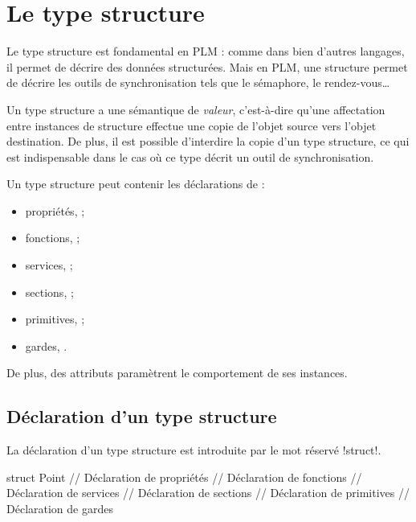 




\chapter{Le type structure}


Le type structure est fondamental en PLM : comme dans bien d'autres langages, il permet de décrire des données structurées. Mais en PLM, une structure permet de décrire les outils de synchronisation tels que le sémaphore, le rendez-vous…

Un type structure a une sémantique de \emph{valeur}, c'est-à-dire qu'une affectation entre instances de structure effectue une copie de l'objet source vers l'objet destination. De plus, il est possible d'interdire la copie d'un type structure, ce qui est indispensable dans le cas où ce type décrit un outil de synchronisation.

Un type structure peut contenir les déclarations de :
\begin{itemize}
\item propriétés,  ;
\item fonctions,  ;
\item services,  ;
\item sections,  ;
\item primitives,  ;
\item gardes, .
\end{itemize}

De plus, des attributs paramètrent le comportement de ses instances.











\section{Déclaration d'un type structure}

La déclaration d'un type structure est introduite par le mot réservé \plm!struct!.

\begin{PLM}
struct Point {
  // Déclaration de propriétés
  // Déclaration de fonctions
  // Déclaration de services
  // Déclaration de sections
  // Déclaration de primitives
  // Déclaration de gardes
}
\end{PLM}


